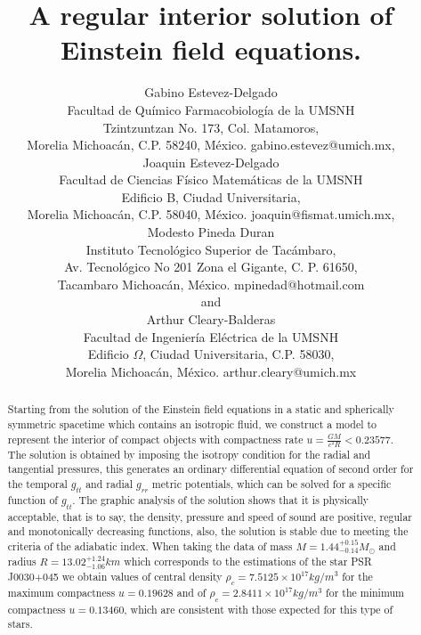 \documentclass[12pt,onecolumn,a4paper]{article}
\begin{document}
\title{A regular interior solution of Einstein field equations.}

\author{Gabino Estevez-Delgado\\
Facultad de Qu\'imico Farmacobiolog\'ia de la UMSNH\\
Tzintzuntzan No. 173, Col. Matamoros,\\ Morelia Michoac\'an, C.P. 58240, M\'exico.
gabino.estevez@umich.mx, \\
Joaquin Estevez-Delgado\\
Facultad de Ciencias F\'isico Matem\'aticas de la UMSNH \\
 Edificio B, Ciudad Universitaria, \\ Morelia Michoac\'an,  C.P. 58040, M\'exico. joaquin@fismat.umich.mx,\\ 
Modesto Pineda Duran \\
Instituto Tecnológico Superior de Tacámbaro,  \\ 
Av. Tecnológico No 201  Zona el Gigante, C. P. 61650,\\
Tacambaro Michoac\'an, M\'exico.  mpinedad@hotmail.com\\
and  \\
Arthur Cleary-Balderas\\
Facultad de Ingenier\'ia El\'ectrica de la UMSNH \\
Edificio $\Omega$, Ciudad Universitaria, C.P. 58030, \\
Morelia Michoac\'an, M\'exico. arthur.cleary@umich.mx
}

\maketitle
\begin{abstract} 
Starting from the solution of the Einstein field equations in a static and spherically symmetric spacetime which contains an isotropic fluid, we construct a model to represent the interior of compact objects with compactness rate  $u=\frac{GM}{c^2R}<0.23577$. The solution is obtained by imposing the isotropy condition for the radial and tangential pressures, this generates an ordinary differential equation of second order for the temporal $g_{tt}$ and radial $g_{rr}$ metric potentials, which can be solved for a specific function of $g_{tt}$. The graphic analysis of the solution shows that it is physically acceptable, that is to say, the density, pressure and speed of sound are positive, regular and monotonically decreasing functions, also, the solution is stable due to meeting the criteria of the adiabatic index. When taking the data of mass $M=1.44^{+0.15}_{-0.14}M_\odot$  and radius $R=13.02^{+1.24}_{-1.06}km$ which corresponds to the estimations of the star PSR J0030+045 we obtain values of central density $\rho_c=7.5125\times 10^{17} kg/m^3$ for the maximum compactness $u=0.19628$ and of $\rho_c=  2.8411 \times 10^{17} kg/m^3$ for the minimum compactness $u=0.13460$, which are consistent with those expected for this type of stars.
\end{abstract}
\end{document}
